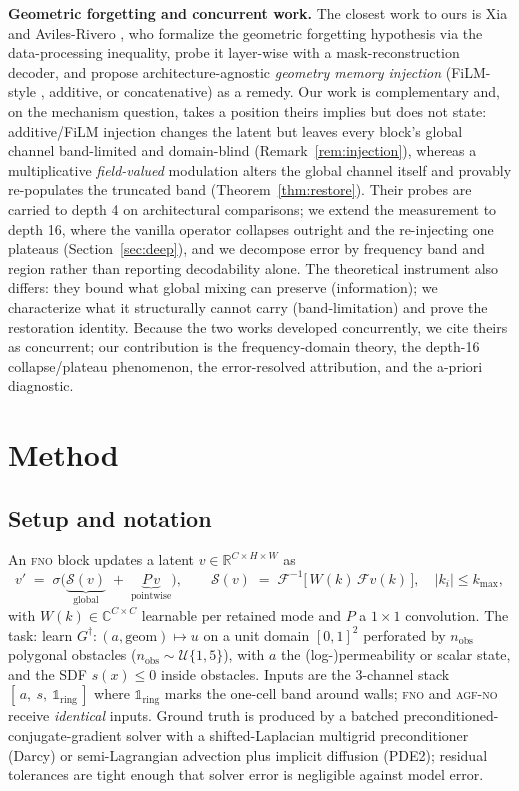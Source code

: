 \documentclass[11pt]{article}
\theoremstyle{definition}
\newcommand{\fno}{\textsc{fno}}
\newcommand{\agfno}{\textsc{agf-no}}
\begin{document}
\textbf{Geometric forgetting and concurrent work.} The closest work to ours
is Xia and Aviles-Rivero \citep{xia2026forgetting}, who formalize the
geometric forgetting hypothesis via the data-processing inequality, probe it
layer-wise with a mask-reconstruction decoder, and propose architecture-agnostic
\emph{geometry memory injection} (FiLM-style \citep{perez2018film}, additive, or
concatenative) as a remedy. Our work is complementary and, on the mechanism question, takes a
position theirs implies but does not state: additive/FiLM injection changes
the latent but leaves every block's global channel band-limited and
domain-blind (Remark~\ref{rem:injection}), whereas a multiplicative
\emph{field-valued} modulation alters the global channel itself and provably
re-populates the truncated band (Theorem~\ref{thm:restore}). Their probes are
carried to depth 4 on architectural comparisons; we extend the measurement to
depth 16, where the vanilla operator collapses outright and the re-injecting
one plateaus (Section~\ref{sec:deep}), and we decompose error by frequency
band and region rather than reporting decodability alone. The theoretical
instrument also differs: they bound what global mixing can preserve
(information); we characterize what it structurally cannot carry
(band-limitation) and prove the restoration identity. Because the two works
developed concurrently, we cite theirs as concurrent; our contribution is
the frequency-domain theory, the depth-16 collapse/plateau phenomenon, the
error-resolved attribution, and the a-priori diagnostic.

\section{Method}
\label{sec:method}

\subsection{Setup and notation}
An \fno{} block updates a latent $v \in \mathbb{R}^{C\times H\times W}$ as
\begin{equation}
v' \;=\; \sigma\!\big(\underbrace{\mathcal{S}(v)}_{\text{global}}
\;+\; \underbrace{P\,v}_{\text{pointwise}}\big), \qquad
\mathcal{S}(v) \;=\; \mathcal{F}^{-1}\!\big[\, W(k)\,\mathcal{F}v(k)\,\big],
\quad |k_i| \le k_{\max},
\label{eq:fno}
\end{equation}
with $W(k) \in \mathbb{C}^{C\times C}$ learnable per retained mode and $P$ a
$1{\times}1$ convolution. The task: learn
$G^\dagger: (a, \text{geom}) \mapsto u$ on a unit domain
$[0,1]^2$ perforated by $n_{\text{obs}}$ polygonal obstacles
($n_{\text{obs}} \sim \mathcal{U}\{1,5\}$), with
$a$ the (log-)permeability or scalar state, and the SDF
$s(x) \le 0$ inside obstacles. Inputs are the 3-channel stack
$[\,a,\ s,\ \mathbb{1}_{\text{ring}}\,]$ where
$\mathbb{1}_{\text{ring}}$ marks the one-cell band around walls; \fno{} and
\agfno{} receive \emph{identical} inputs. Ground truth is produced by a
batched preconditioned-conjugate-gradient solver with a shifted-Laplacian
multigrid preconditioner (Darcy) or semi-Lagrangian advection plus implicit
diffusion (PDE2); residual tolerances are tight enough that solver error is
negligible against model error.
\end{document}
